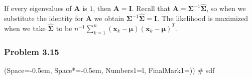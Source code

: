\documentclass[12pt, a4paper]{article}
\newcommand{\listSpace}{-0.5em}%
\newcommand{\vect}[1]{\bm{#1}}
\begin{document}
\begin{easylist}[enumerate]
If every eigenvalues of $\vect{A}$ is $1$, then $\vect{A} = \vect{I}$.
Recall that $\vect{A} = \vect{\Sigma}^{-1} \hat{\vect{\Sigma}}$, so when we substitute the identity for $\vect{A}$ we obtain $\vect{\Sigma}^{-1} \hat{\vect{\Sigma}} = \vect{I}$.
The likelihood is maximized when we take $\hat{\vect{\Sigma}}$ to be $ n^{-1} \sum_{k=1}^{n} \left( \vect{x}_k - \vect{\mu} \right) \left( \vect{x}_k - \vect{\mu} \right)^T$.
\end{easylist}

\subsubsection*{Problem 3.15}
\begin{easylist}[enumerate]
	\ListProperties(Space=\listSpace, Space*=\listSpace, Numbers1=l, FinalMark1={)})
	# sdf
\end{easylist}
\end{document}
